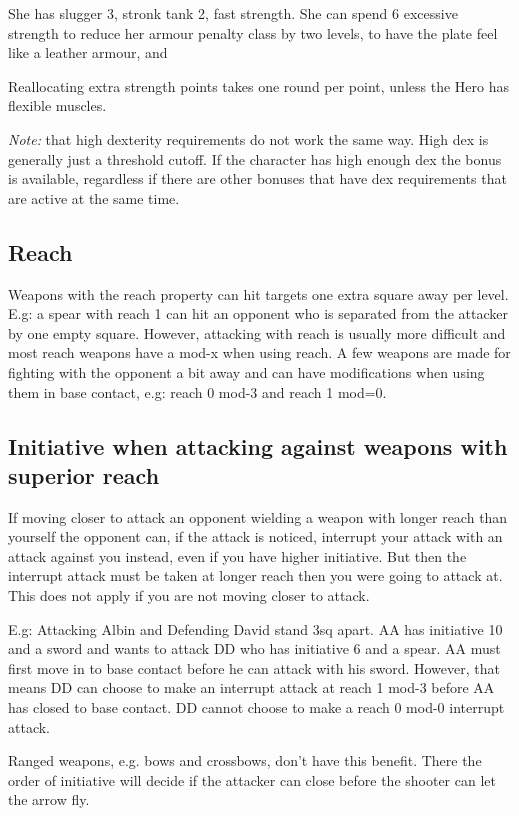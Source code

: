 She has slugger 3, stronk tank 2, fast strength.
She can spend 6 excessive strength to reduce her armour penalty class by two levels, to have the plate feel like a leather armour, and 

Reallocating extra strength points takes one round per point, unless the Hero has flexible muscles.

\emph{Note:} that high dexterity requirements do not work the same way. High dex is generally just a threshold cutoff. If the character has high enough dex the bonus is available, regardless if there are other bonuses that have dex requirements that are active at the same time.


\subsection*{Reach}
Weapons with the reach property can hit targets one extra square away per level.
E.g: a spear with reach 1 can hit an opponent who is separated from the attacker by one empty square. However, attacking with reach is usually more difficult and most reach weapons have a mod-x when using reach.
A few weapons are made for fighting with the opponent a bit away and can have modifications when using them in base contact, e.g: reach 0 mod-3 and reach 1 mod=0.


\subsection*{Initiative when attacking against weapons with superior reach}
If moving closer to attack an opponent wielding a weapon with longer reach than yourself the opponent can, if the attack is noticed, interrupt your attack with an attack against you instead, even if you have higher initiative. But then the interrupt attack must be taken at longer reach then you were going to attack at. This does not apply if you are not moving closer to attack.

E.g: Attacking Albin and Defending David stand 3sq apart. AA has initiative 10 and a sword and wants to attack DD who has initiative 6 and a spear. AA must first move in to base contact before he can attack with his sword. However, that means DD can choose to make an interrupt attack at reach 1 mod-3 before AA has closed to base contact. DD cannot choose to make a reach 0 mod-0 interrupt attack.

Ranged weapons, e.g. bows and crossbows, don't have this benefit. There the order of initiative will decide if the attacker can close before the shooter can let the arrow fly.



